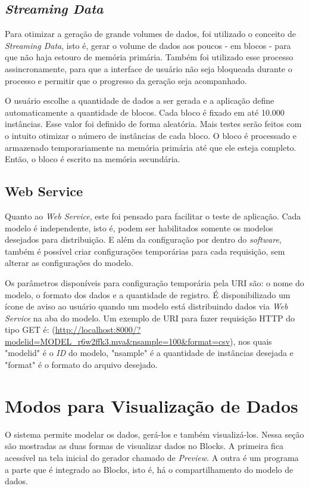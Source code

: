 \documentclass[
	12pt,				%
	openright,			%
	oneside,			%
	a4paper,			%
	english,			%
	brazil				%
	]{abntex2}
\begin{document}
		\subsection{\emph{Streaming Data}}
			Para otimizar a geração de grande volumes de dados, foi utilizado o conceito de \emph{Streaming Data}, isto é, gerar o volume de dados aos poucos - em blocos - para que não haja estouro de memória primária.
			Também foi utilizado esse processo assincronamente, para que a interface de usuário não seja bloqueada durante o processo e permitir que o progresso da geração seja acompanhado.
			\par
			O usuário escolhe a quantidade de dados a ser gerada e a aplicação define automaticamente a quantidade de blocos.
			Cada bloco é fixado em até 10.000 instâncias.
			Esse valor foi definido de forma aleatória.
			Mais testes serão feitos com o intuito otimizar o número de instâncias de cada bloco.
			O bloco é processado e armazenado temporariamente na memória primária até que ele esteja completo.
			Então, o bloco é escrito na memória secundária.
		\subsection{Web Service}
			Quanto ao \emph{Web Service}, este foi pensado para facilitar o teste de aplicação.
			Cada modelo é independente, isto é, podem ser habilitados somente os modelos desejados para distribuição.
			E além da configuração por dentro do \emph{software}, também é possível criar configurações temporárias para cada requisição, sem alterar as configurações do modelo.
			\par
			Os parâmetros disponíveis para configuração temporária pela URI são: o nome do modelo, o formato dos dados e a quantidade de registro.
			É disponibilizado um ícone de aviso ao usuário quando um modelo está distribuindo dados via \emph{Web Service} na aba do modelo.
			Um exemplo de URI para fazer requisição HTTP do tipo GET é: (\url{http://localhost:8000/?modelid=MODEL_r6w2ffk3.mva&nsample=100&format=csv}), nos quais "modelid" é o \emph{ID} do modelo, "nsample" é a quantidade de instâncias desejada e "format" é o formato do arquivo desejado.
	 
	\section{Modos para Visualização de Dados}
		O sistema permite modelar os dados, gerá-los e também visualizá-los.
		Nessa seção são mostradas as duas formas de visualizar dados no Blocks.
		A primeira fica acessível na tela inicial do gerador chamado de \emph{Preview}.
		A outra é um programa a parte que é integrado ao Blocks, isto é, há o compartilhamento do modelo de dados.
\end{document}
